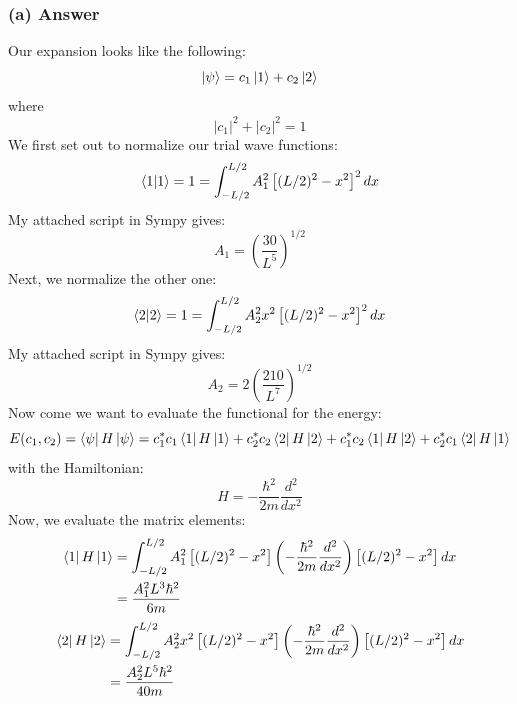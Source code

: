 \documentclass{article}
\begin{document}
\subsubsection*{(a) Answer}
Our expansion looks like the following:
\begin{equation}
    \ket{\psi} = c_1\ket{1} + c_2\ket{2}
\end{equation}
where
\begin{equation}
    |c_1|^2 + |c_2|^2 = 1
\end{equation}
We first set out to normalize our trial wave functions:
\begin{align}
    \braket{1}{1} = 1 &= \int_{-L/2}^{L/2} A_1^2 \left[ (L/2)^2 - x^2 \right]^2 dx \\
\end{align}
My attached script in Sympy gives:
\begin{equation}
\boxed{A_1 = \left(\frac{30}{L^5}\right)^{1/2}}
\end{equation}
Next, we normalize the other one:
\begin{align}
    \braket{2}{2} = 1 &= \int_{-L/2}^{L/2} A_2^2 x^2 \left[ (L/2)^2 - x^2 \right]^2 dx \\
\end{align}
My attached script in Sympy gives:
\begin{equation}
\boxed{A_2 = 2\left(\frac{210}{L^7}\right)^{1/2}}
\end{equation}
Now come we want to evaluate the functional for the energy:
\begin{equation}
    E(c_1, c_2) = \bra{\psi}H\ket{\psi} = c_1^*c_1\bra{1}H\ket{1} + c_2^*c_2\bra{2}H\ket{2} + c_1^*c_2\bra{1}H\ket{2} + c_2^*c_1\bra{2}H\ket{1}
\end{equation}
with the Hamiltonian:
\begin{equation}
    H = -\frac{\hbar^2}{2m}\frac{d^2}{dx^2}
\end{equation}
Now, we evaluate the matrix elements:
\begin{align}
    \bra{1}H\ket{1} &= \int_{-L/2}^{L/2} A_1^2 \left[ (L/2)^2 - x^2 \right] \left(-\frac{\hbar^2}{2m}\frac{d^2}{dx^2}\right) \left[ (L/2)^2 - x^2 \right] dx \\ &= \frac{A_1^2L^3\hbar^2}{6m}
\end{align}
\begin{align}
    \bra{2}H\ket{2} &= \int_{-L/2}^{L/2} A_2^2 x^2 \left[ (L/2)^2 - x^2 \right] \left(-\frac{\hbar^2}{2m}\frac{d^2}{dx^2}\right) \left[ (L/2)^2 - x^2 \right] dx \\ &= \frac{A_2^2L^5\hbar^2}{40m}
\end{align}
\end{document}

